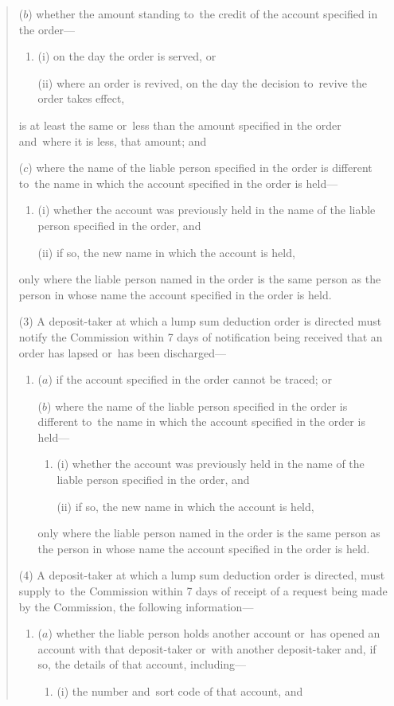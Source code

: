 \documentclass[12pt,a4paper]{article}
\begin{document}
\begin{quotation}
\begin{enumerate}
($b$) whether the amount standing to~the credit of the account specified in the order—
\begin{enumerate}\item[]
(i) on the day the order is served, or

(ii) where an order is revived, on the day the decision to~revive the order takes effect,
\end{enumerate}
is at least the same or~less than the amount specified in the order and~where it is less, that amount; and

($c$) where the name of the liable person specified in the order is different to~the name in which the account specified in the order is held—
\begin{enumerate}\item[]
(i) whether the account was previously held in the name of the liable person specified in the order, and

(ii) if so, the new name in which the account is held,
\end{enumerate}
only where the liable person named in the order is the same person as the person in whose name the account specified in the order is held.
\end{enumerate}

(3) A deposit-taker at which a lump sum deduction order is directed must notify the Commission within 7 days of notification being received that an order has lapsed or~has been discharged—
\begin{enumerate}\item[]
($a$) if the account specified in the order cannot be traced; or

($b$) where the name of the liable person specified in the order is different to~the name in which the account specified in the order is held—
\begin{enumerate}\item[]
(i) whether the account was previously held in the name of the liable person specified in the order, and

(ii) if so, the new name in which the account is held,
\end{enumerate}
only where the liable person named in the order is the same person as the person in whose name the account specified in the order is held.
\end{enumerate}

(4) A deposit-taker at which a lump sum deduction order is directed, must supply to~the Commission within 7 days of receipt of a request being made by the Commission, the following information—
\begin{enumerate}\item[]
($a$) whether the liable person holds another account or~has opened an account with that deposit-taker or~with another deposit-taker and, if so, the details of that account, including—
\begin{enumerate}\item[]
(i) the number and~sort code of that account, and


\end{enumerate}
\end{enumerate}
\end{quotation}
\end{document}
